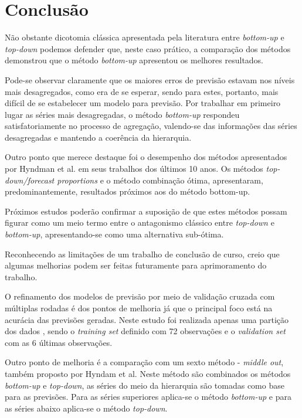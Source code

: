 \documentclass[
	12pt,				%
	openright,			%
	twoside,			%
	a4paper,			%
	english,			%
	french,				%
	spanish,			%
	brazil				%
	]{abntex2}
\begin{document}

\chapter*[Conclusão]{Conclusão}

Não obstante dicotomia clássica apresentada pela literatura entre \emph{bottom-up} e\emph{ top-down} podemos defender que, neste caso prático, a comparação dos métodos demonstrou que o método \emph{bottom-up} apresentou os melhores resultados.

Pode-se observar claramente que os maiores erros de previsão estavam nos níveis mais desagregados, como era de se esperar, sendo para estes, portanto, mais difícil de se estabelecer um modelo para previsão. Por trabalhar em primeiro lugar as séries mais desagregadas, o método \emph{bottom-up} respondeu satisfatoriamente no processo de agregação, valendo-se das informações das séries desagregadas e mantendo a coerência da hierarquia.

Outro ponto que merece destaque foi o desempenho dos métodos apresentados por Hyndman et al. em seus trabalhos dos últimos 10 anos. Os métodos \emph{top-down/forecast proportions} e o método combinação ótima, apresentaram, predominantemente, resultados próximos aos do método bottom-up.

Próximos estudos poderão confirmar a suposição de que estes métodos possam figurar como um meio termo entre o antagonismo clássico entre \emph{top-down} e \emph{bottom-up}, apresentando-se como uma alternativa sub-ótima.

Reconhecendo as limitações de um trabalho de conclusão de curso, creio que algumas melhorias podem ser feitas futuramente para aprimoramento do trabalho.

O refinamento dos modelos de previsão por meio de validação cruzada com múltiplas rodadas é dos pontos de melhoria já que o principal foco está na acurácia das previsões geradas. Neste estudo foi realizada apenas uma partição dos dados , sendo o \emph{training set} definido com 72 observações  e o \emph{validation set} com as 6 últimas observações.

Outro ponto de melhoria é a comparação com um sexto método - \emph{middle out}, também proposto por Hyndam et al. Neste método são combinados os métodos \emph{bottom-up} e \emph{top-down}, as séries do meio da hierarquia são tomadas como base para as previsões. Para as séries superiores aplica-se o método \emph{bottom-up} e para as séries abaixo aplica-se o método \emph{top-down}.
\end{document}
